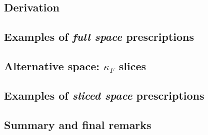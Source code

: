 


\subsection{Derivation}
\label{sec:mhou/prescr/deriv}


\subsection{Examples of \textit{full space} prescriptions}
\label{sec:mhou/prescr/main-ex}


\subsection{Alternative space: $\kappa_F$ slices}
\label{sec:mhou/prescr/slices}


\subsection{Examples of \textit{sliced space} prescriptions}
\label{sec:mhou/prescr/slices-ex}


\subsection{Summary and final remarks}
\label{sec:mhou/prescr/recap}

